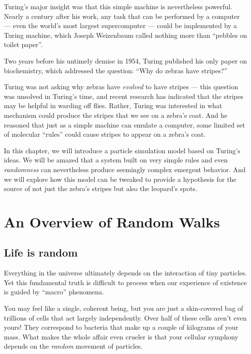 Turing's major insight was that this simple machine is nevertheless powerful. Nearly a century after his work, any task that can be performed by a computer --- even the world's most largest supercomputer --- could be implemented by a Turing machine, which Joseph Weizenbaum called nothing more than ``pebbles on toilet paper''.

Two years before his untimely demise in 1954, Turing published his only paper on biochemistry, which addressed the question: “Why do zebras have stripes?”

Turing was not asking why zebras have \textit{evolved} to have stripes --- this question was unsolved in Turing's time, and recent research has indicated that the stripes may be helpful in warding off flies. Rather, Turing was interested in what mechanism could produce the stripes that we see on a zebra's coat. And he reasoned that just as a simple machine can emulate a computer, some limited set of molecular ``rules'' could cause stripes to appear on a zebra's coat.

In this chapter, we will introduce a particle simulation model based on Turing's ideas. We will be amazed that a system built on very simple rules and even \textit{randomness} can nevertheless produce seemingly complex emergent behavior. And we will explore how this model can be tweaked to provide a hypothesis for the source of not just the zebra's stripes but also the leopard's spots.\\

\FloatBarrier
{}

\section{An Overview of Random Walks}
\label{sec:an_overview_of_random_walks}

\subsection{Life is random}

Everything in the universe ultimately depends on the interaction of tiny particles. Yet this fundamental truth is difficult to process when our experience of existence is guided by ``macro'' phenomena.

You may feel like a single, coherent being, but you are just a skin-covered bag of trillions of cells that act largely independently. Over half of these cells aren't even yours! They correspond to bacteria that make up a couple of kilograms of your mass. What makes the whole affair even crueler is that your cellular symphony depends on the \textit{random} movement of particles.

